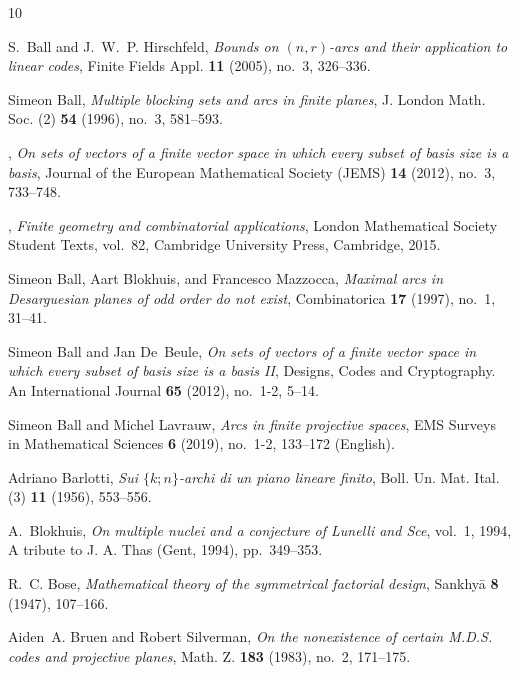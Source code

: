 \documentclass[11pt,a4paper]{amsart}
\theoremstyle{plain}
\theoremstyle{definition}
\theoremstyle{remark}
\begin{document}
	\begin{thebibliography}{10}

		S.~Ball and J.~W.~P. Hirschfeld, \emph{Bounds on {$(n,r)$}-arcs and their
			application to linear codes}, Finite Fields Appl. \textbf{11} (2005), no.~3,
		326--336. 

		Simeon Ball, \emph{{M}ultiple blocking sets and arcs in finite planes}, J.
		London Math. Soc. (2) \textbf{54} (1996), no.~3, 581--593. 

		\bysame, \emph{On sets of vectors of a finite vector space in which every
			subset of basis size is a basis}, Journal of the European Mathematical
		Society (JEMS) \textbf{14} (2012), no.~3, 733--748. 

		\bysame, \emph{Finite geometry and combinatorial applications}, London
		Mathematical Society Student Texts, vol.~82, Cambridge University Press,
		Cambridge, 2015. 

		Simeon Ball, Aart Blokhuis, and Francesco Mazzocca, \emph{Maximal arcs in
			{D}esarguesian planes of odd order do not exist}, Combinatorica \textbf{17}
		(1997), no.~1, 31--41. 

		Simeon Ball and Jan De~Beule, \emph{On sets of vectors of a finite vector space
			in which every subset of basis size is a basis {II}}, Designs, Codes and
		Cryptography. An International Journal \textbf{65} (2012), no.~1-2, 5--14.

		Simeon Ball and Michel Lavrauw, \emph{Arcs in finite projective spaces}, EMS
		Surveys in Mathematical Sciences \textbf{6} (2019), no.~1-2, 133--172
		(English).

		Adriano Barlotti, \emph{Sui {$\{k;n\}$}-archi di un piano lineare finito},
		Boll. Un. Mat. Ital. (3) \textbf{11} (1956), 553--556. 

		A.~Blokhuis, \emph{On multiple nuclei and a conjecture of {L}unelli and {S}ce},
		vol.~1, 1994, A tribute to J. A. Thas (Gent, 1994), pp.~349--353.

		R.~C. Bose, \emph{Mathematical theory of the symmetrical factorial design},
		Sankhy\=a \textbf{8} (1947), 107--166. 

		Aiden~A. Bruen and Robert Silverman, \emph{On the nonexistence of certain
			{M}.{D}.{S}. codes and projective planes}, Math. Z. \textbf{183} (1983),
		no.~2, 171--175. 


\end{thebibliography}
\end{document}
